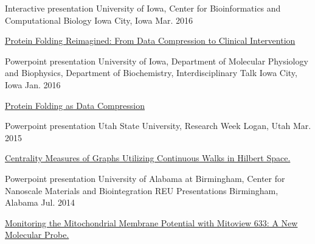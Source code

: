 


\begin{cventries}

\cventry
{Interactive presentation} %
{University of Iowa, Center for Bioinformatics and Computational Biology} %
{Iowa City, Iowa} %
{Mar. 2016} %
{ %
\begin{cvitems}
\item { \href{https://prezi.com/kylgyfxdjz6o/the-beginning-of-a-world-without-genetic-disease/}{Protein Folding Reimagined: From Data Compression to Clinical Intervention} }
\end{cvitems}
}

\cventry
{Powerpoint presentation} %
{University of Iowa, Department of Molecular Physiology and Biophysics, Department of Biochemistry, Interdisciplinary Talk} %
{Iowa City, Iowa} %
{Jan. 2016} %
{ %
\begin{cvitems}
\item{\href{https://www.researchgate.net/publication/300823699_Protein_Folding_as_Data_Compression}{Protein Folding as Data Compression}}
\end{cvitems}
}

\cventry
{Powerpoint presentation} %
{Utah State University, Research Week} %
{Logan, Utah} %
{Mar. 2015} %
{ %
\begin{cvitems}
\item {\href{https://www.researchgate.net/publication/303565772_Centrality_Measures_of_Graphs_utilizing_Continuous_Walks_in_Hilbert_Space}{Centrality Measures of Graphs Utilizing Continuous Walks in Hilbert Space.}}
\end{cvitems}
}

\cventry
{Powerpoint presentation} %
{University of Alabama at Birmingham, Center for Nanoscale Materials and Biointegration REU Presentations} %
{Birmingham, Alabama} %
{Jul. 2014} %
{ %
\begin{cvitems}
\item {\href{https://www.researchgate.net/publication/276313026_Monitoring_Mitochondrial_Membrane_Potential_with_Mitoview_633_A_New_Molecular_Probe}{Monitoring the Mitochondrial Membrane Potential with Mitoview 633: A New Molecular Probe.}}
\end{cvitems}
}


\end{cventries}
